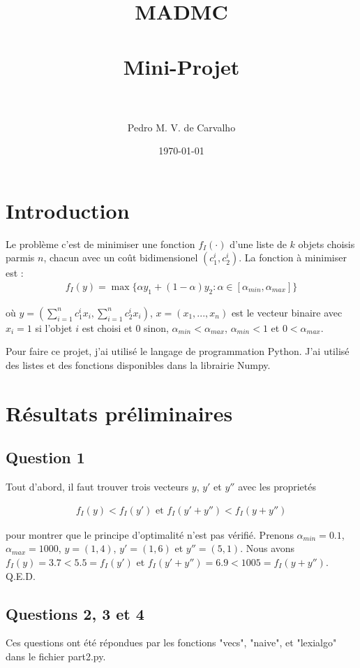 \documentclass[paper=a4, fontsize=11pt]{scrartcl} %
\title{	
\normalfont \normalsize 
\textsc{MADMC} \\ [25pt] %
\horrule{0.5pt} \\[0.4cm] %
\huge Mini-Projet \\ %
\horrule{2pt} \\[0.5cm] %
}
\author{Pedro M. V. de Carvalho} %
\date{\normalsize\today} %
\numberwithin{equation}{section} %
\numberwithin{figure}{section} %
\numberwithin{table}{section} %
\begin{document}
\maketitle %

\section{Introduction}

Le probl\`eme c'est de minimiser une fonction $f_I(\cdot)$ d'une liste de $k$ objets choisis parmis $n$, chacun avec un co\^ut bidimensionel $(c^i_1, c^i_2)$. La fonction \`a minimiser est :
\begin{align} 
f_I(y) = \max\{\alpha y_1 + (1-\alpha)y_2:\alpha\in[\alpha_{min},\alpha_{max}]\}				
\end{align}

o\`u $y = (\sum_{i=1}^nc^i_1x_i, \sum_{i=1}^nc^i_2x_i)$, $x=(x_1, ..., x_n)$ est le vecteur binaire avec $x_i = 1$ si l'objet $i$ est choisi et $0$ sinon, $\alpha_{min}<\alpha_{max}$, $\alpha_{min}<1$ et $0<\alpha_{max}$.

Pour faire ce projet, j'ai utilis\'e le langage de programmation Python. J'ai utilis\'e des listes et des fonctions disponibles dans la librairie Numpy.

\section{R\'esultats pr\'eliminaires}

\subsection{Question 1}
Tout d'abord, il faut trouver trois vecteurs $y$, $y'$ et $y''$ avec les propriet\'es 

\begin{align}
f_I(y) < f_I(y')\text{ et }f_I(y'+y'')<f_I(y+y'')
\end{align}

 pour montrer que le principe d'optimalit\'e n'est pas v\'erifi\'e. Prenons $\alpha_{min} = 0.1$, $\alpha_{max} = 1000$, $y = (1, 4)$, $y' = (1, 6)$ et $y'' = (5, 1)$. Nous avons $f_I(y) = 3.7 < 5.5 = f_I(y')$ et $f_I(y'+y'') = 6.9 < 1005 = f_I(y + y'')$. Q.E.D.

\subsection{Questions 2, 3 et 4}
Ces questions ont \'et\'e r\'epondues par les fonctions "vecs", "naive", et "lexialgo" dans le fichier part2.py.
\end{document}
